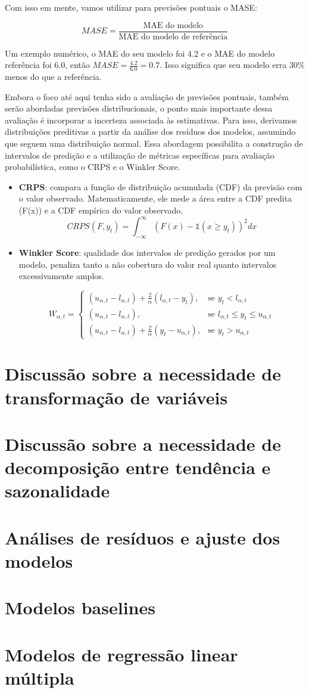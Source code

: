 \documentclass{article}
\begin{document}
Com isso em mente, vamos utilizar para previsões pontuais o MASE:

$$MASE = \dfrac{\text{MAE do modelo}}{\text{MAE do modelo de referência}}$$

Um exemplo numérico, o MAE do seu modelo foi 4.2 e  o MAE do modelo referência foi 6.0, então $MASE
=\frac{4.2}{6.0}= 0.7$. Isso significa que seu modelo erra 30\% menos do que a referência.

Embora o foco até aqui tenha sido a avaliação de previsões pontuais, também serão abordadas previsões distribucionais, o ponto mais importante dessa avaliação é incorporar a incerteza associada às estimativas.
Para isso, derivamos distribuições preditivas a partir da análise dos resíduos dos modelos, assumindo que seguem uma distribuição normal. Essa abordagem possibilita a construção de intervalos de predição e a utilização de métricas específicas para avaliação probabilística, como o CRPS e o Winkler Score.
\begin{itemize}
    \item \textbf{CRPS}: compara a função de distribuição acumulada (CDF) da previsão com o valor observado. Matematicamente, ele mede a área entre a CDF predita (F(x)) e a CDF empírica do valor observado.
    $$CRPS(F, y_t) = \int_{-\infty}^{\infty}(F(x)- \mathbb{1}(x \geq y_t))^2 dx $$
    \item \textbf{Winkler Score}: qualidade dos intervalos de predição gerados por um modelo, penaliza tanto a não cobertura do valor real quanto intervalos excessivamente amplos.

    $$
W_{\alpha, t} = 
\begin{cases}
(u_{\alpha, t} - l_{\alpha, t}) + \frac{2}{\alpha} (l_{\alpha, t} - y_t), & \text{se } y_t < l_{\alpha, t} \\
(u_{\alpha, t} - l_{\alpha, t}), & \text{se } l_{\alpha, t} \leq y_t \leq u_{\alpha, t} \\
(u_{\alpha, t} - l_{\alpha, t}) + \frac{2}{\alpha} (y_t - u_{\alpha, t}), & \text{se } y_t > u_{\alpha, t}
\end{cases}
    $$
\end{itemize}


\section{Discussão sobre a necessidade de transformação de variáveis}


\section{Discussão sobre a necessidade de decomposição entre tendência e sazonalidade}

\section{Análises de resíduos e ajuste dos modelos}
\section{Modelos baselines}

\section{Modelos de regressão linear múltipla}
\end{document}

